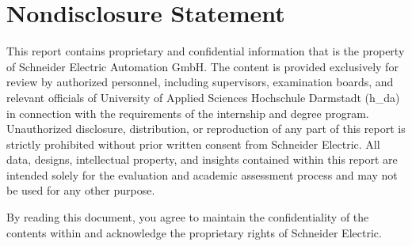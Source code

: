 \thispagestyle{empty} 
\chapter*{Nondisclosure Statement}

This report contains proprietary and confidential information that is the property of Schneider Electric Automation GmbH. The content is provided exclusively for review by authorized personnel, including supervisors, examination boards, and relevant officials of University of Applied Sciences Hochschule Darmstadt (h\_da) in connection with the requirements of the internship and degree program. Unauthorized disclosure, distribution, or reproduction of any part of this report is strictly prohibited without prior written consent from Schneider Electric. All data, designs, intellectual property, and insights contained within this report are intended solely for the evaluation and academic assessment process and may not be used for any other purpose.

By reading this document, you agree to maintain the confidentiality of the contents within and acknowledge the proprietary rights of Schneider Electric.